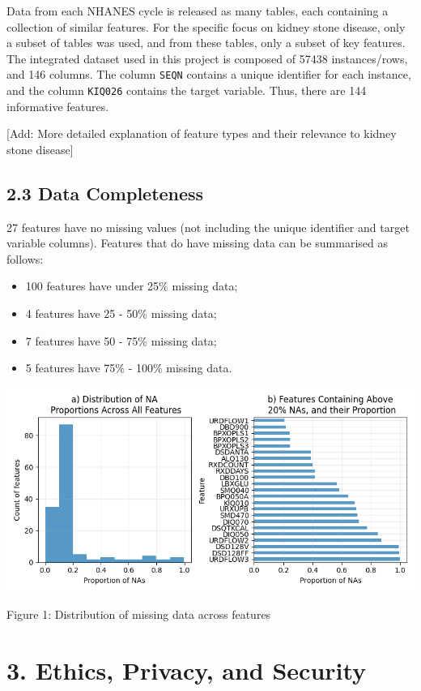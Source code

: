 \documentclass[
]{article}
\providecommand{\tightlist}{%
  \setlength{\itemsep}{0pt}\setlength{\parskip}{0pt}}
\begin{document}
Data from each NHANES cycle is released as many tables, each containing
a collection of similar features. For the specific focus on kidney stone
disease, only a subset of tables was used, and from these tables, only a
subset of key features. The integrated dataset used in this project is
composed of 57438 instances/rows, and 146 columns. The column
\texttt{SEQN} contains a unique identifier for each instance, and the
column \texttt{KIQ026} contains the target variable. Thus, there are 144
informative features.

{[}Add: More detailed explanation of feature types and their relevance
to kidney stone disease{]}

\hypertarget{data-completeness}{%
\subsection{2.3 Data Completeness}\label{data-completeness}}

27 features have no missing values (not including the unique identifier
and target variable columns). Features that do have missing data can be
summarised as follows:

\begin{itemize}
\tightlist
\item
  100 features have under 25\% missing data;
\item
  4 features have 25 - 50\% missing data;
\item
  7 features have 50 - 75\% missing data;
\item
  5 features have 75\% - 100\% missing data.
\end{itemize}

\includegraphics{../figures/na_prop.png}

Figure 1: Distribution of missing data across features

\hypertarget{ethics-privacy-and-security}{%
\section{3. Ethics, Privacy, and
Security}\label{ethics-privacy-and-security}}
\end{document}
